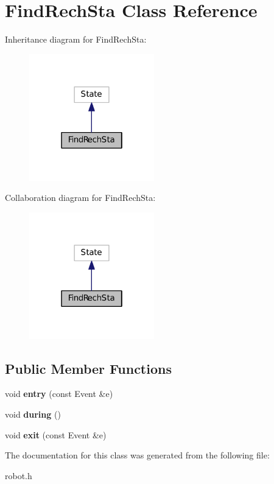 \hypertarget{classFindRechSta}{\section{Find\+Rech\+Sta Class Reference}
\label{classFindRechSta}
}


Inheritance diagram for Find\+Rech\+Sta\+:
\nopagebreak
\begin{figure}[H]
\begin{center}
\leavevmode
\includegraphics[width=154pt]{classFindRechSta__inherit__graph}
\end{center}
\end{figure}


Collaboration diagram for Find\+Rech\+Sta\+:
\nopagebreak
\begin{figure}[H]
\begin{center}
\leavevmode
\includegraphics[width=154pt]{classFindRechSta__coll__graph}
\end{center}
\end{figure}
\subsection*{Public Member Functions}
\begin{DoxyCompactItemize}
\item 
\hypertarget{classFindRechSta_a0cf1b5250e971482f267063bc83128c8}{void {\bfseries entry} (const Event \&e)}\label{classFindRechSta_a0cf1b5250e971482f267063bc83128c8}

\item 
\hypertarget{classFindRechSta_a72325611ca2d1c8a4b5d5ffefe6ff058}{void {\bfseries during} ()}\label{classFindRechSta_a72325611ca2d1c8a4b5d5ffefe6ff058}

\item 
\hypertarget{classFindRechSta_add1af0576c619b20c596741aec4b4367}{void {\bfseries exit} (const Event \&e)}\label{classFindRechSta_add1af0576c619b20c596741aec4b4367}

\end{DoxyCompactItemize}


The documentation for this class was generated from the following file\+:\begin{DoxyCompactItemize}
\item 
robot.\+h\end{DoxyCompactItemize}

